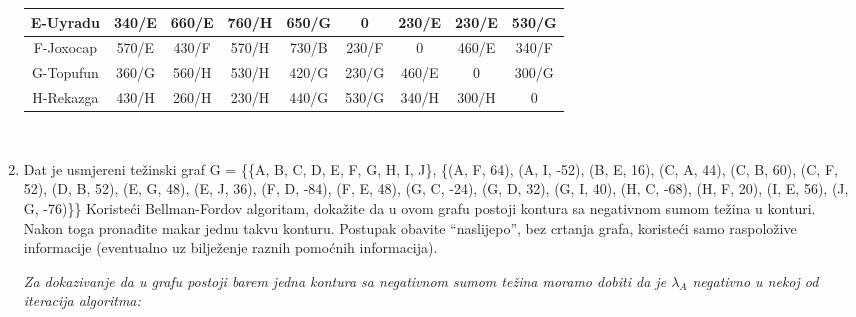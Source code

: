 \documentclass[12pt]{article}
\begin{document}
\begin{enumerate}
\begin{center}
{\begin{tabular}{|c|c|c|c|c|c|c|c|c|}
E-Uyradu & 340/E & 660/E & 760/H & 650/G & 0 & 230/E & 230/E & 530/G \\ \hline
F-Joxocap & 570/E & 430/F & 570/H & 730/B & 230/F & 0 & 460/E & 340/F \\ \hline
G-Topufun & 360/G & 560/H & 530/H & 420/G & 230/G & 460/E & 0 & 300/G \\ \hline
H-Rekazga & 430/H & 260/H & 230/H & 440/G & 530/G & 340/H & 300/H & 0 \\ \hline
\end{tabular}%
      }\\
     \end{center}
     \newpage
	\item Dat je usmjereni težinski graf
G = \{\{A, B, C, D, E, F, G, H, I, J\}, \{(A, F, 64), (A, I, -52), (B, E, 16), (C, A, 44), (C, B, 60), (C, F, 52), (D, B, 52), (E, G, 48), (E, J, 36), (F, D, -84), (F, E, 48), (G, C, -24), (G, D, 32), (G, I, 40), (H, C, -68), (H, F, 20), (I, E, 56), (J, G, -76)\}\}
Koristeći Bellman-Fordov algoritam, dokažite da u ovom grafu postoji kontura sa negativnom sumom težina u konturi.\\ Nakon toga pronađite makar jednu takvu konturu. Postupak obavite “naslijepo”, bez crtanja grafa, koristeći samo raspoložive informacije (eventualno uz bilježenje raznih pomoćnih informacija).\\
\begin{center}
 \textit{Za dokazivanje da u grafu postoji barem jedna kontura sa negativnom sumom težina moramo dobiti da je $\lambda_A$ negativno u nekoj od iteracija algoritma:\\}
 \vspace{0.5cm}
\\



\end{center}
\end{enumerate}
\end{document}
